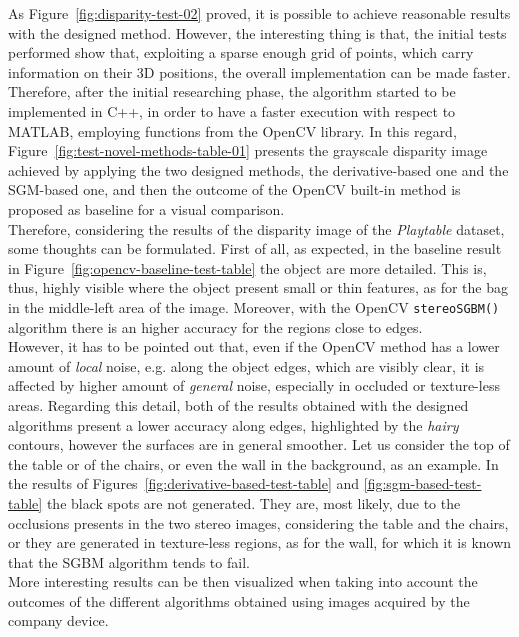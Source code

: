 As Figure~\ref{fig:disparity-test-02} proved, it is possible to achieve reasonable results with the designed method.
However, the interesting thing is that, the initial tests performed show that, exploiting a sparse enough grid of points, which carry information on their 3D positions, the overall implementation can be made faster.\\
Therefore, after the initial researching phase, the algorithm started to be implemented in C++, in order to have a faster execution with respect to MATLAB, employing functions from the OpenCV library.
In this regard, Figure~\ref{fig:test-novel-methods-table-01} presents the grayscale disparity image achieved by applying the two designed methods, the derivative-based one and the SGM-based one, and then the outcome of the OpenCV built-in method is proposed as baseline for a visual comparison.\\
Therefore, considering the results of the disparity image of the \textit{Playtable} dataset, some thoughts can be formulated.
First of all, as expected, in the baseline result in Figure~\ref{fig:opencv-baseline-test-table} the object are more detailed.
This is, thus, highly visible where the object present small or thin features, as for the bag in the middle-left area of the image.
Moreover, with the OpenCV \texttt{stereoSGBM()} algorithm there is an higher accuracy for the regions close to edges. \\
However, it has to be pointed out that, even if the OpenCV method has a lower amount of \textit{local} noise, e.g. along the object edges, which are visibly clear, it is affected by higher amount of \textit{general} noise, especially in occluded or texture-less areas.
Regarding this detail, both of the results obtained with the designed algorithms present a lower accuracy along edges, highlighted by the \textit{hairy} contours, however the surfaces are in general smoother.
Let us consider the top of the table or of the chairs, or even the wall in the background, as an example.
In the results of Figures~\ref{fig:derivative-based-test-table} and \ref{fig:sgm-based-test-table} the black spots are not generated.
They are, most likely, due to the occlusions presents in the two stereo images, considering the table and the chairs, or they are generated in texture-less regions, as for the wall, for which it is known that the SGBM algorithm tends to fail.\\
More interesting results can be then visualized when taking into account the outcomes of the different algorithms obtained using images acquired by the company device.
